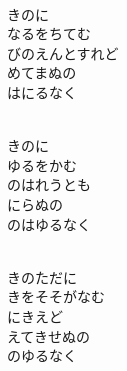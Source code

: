 \documentclass[10pt,b5j]{tarticle} %
\begin{document}
\vspace{1.5em} %
\newcommand{\linespace}{0.5em} %
\newcommand{\blocksize}{0.5\hsize} %
\newcommand{\itemmargin}{6em} %
\begin{enumerate} %
    \setlength{\itemindent}{\itemmargin} %
    \begin{minipage}[c]{\blocksize}
    
        \vspace{\linespace}
        \item~\\
        きのに\\
        なるをちてむ\\
        びのえんとすれど\\
        めてまぬの\\
        はにるなく
        
        \vspace{\linespace}
        \item~\\
        きのに\\
        ゆるをかむ\\
        のはれうとも\\
        にらぬの\\
        のはゆるなく
        
        \vspace{\linespace}
        \item~\\
        きのただに\\
        きをそそがなむ\\
        にきえど\\
        えてきせぬの\\
        のゆるなく
    
    \end{minipage}
\end{enumerate} %
\end{document}
